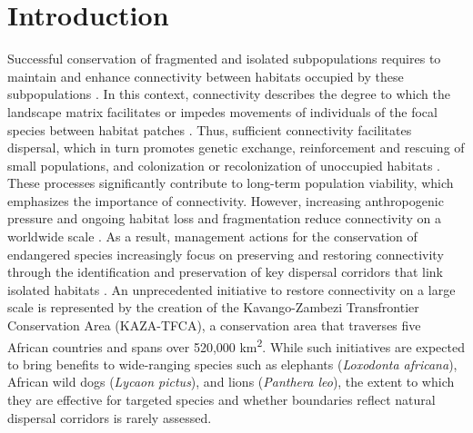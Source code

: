 \documentclass[abstract=on,10pt,a4paper,bibliography=totocnumbered]{scrartcl}
\begin{document}
\onehalfspacing
\tableofcontents
\doublespacing
\newpage


\section{Introduction}
Successful conservation of fragmented and isolated subpopulations requires to
maintain and enhance connectivity between habitats occupied by these
subpopulations \citep{Hanski.1998}. In this context, connectivity describes the
degree to which the landscape matrix facilitates or impedes movements of
individuals of the focal species between habitat patches \citep{Taylor.1993,
Clobert.2012}. Thus, sufficient connectivity facilitates dispersal, which in
turn promotes genetic exchange, reinforcement and rescuing of small populations,
and colonization or recolonization of unoccupied habitats \citep{Brown.1977,
Hanski.1998, MacArthur.2001, Frankham.2002, Leigh.2012}. These processes
significantly contribute to long-term population viability, which emphasizes the
importance of connectivity. However, increasing anthropogenic pressure and
ongoing habitat loss and fragmentation reduce connectivity on a worldwide scale
\citep{Fahrig.2003, Barnosky.2012}. As a result, management actions for the
conservation of endangered species increasingly focus on preserving and
restoring connectivity through the identification and preservation of key
dispersal corridors that link isolated habitats \citep{Fahrig.2003,
Heller.2009}. An unprecedented initiative to restore connectivity on a large
scale is represented by the creation of the Kavango-Zambezi Transfrontier
Conservation Area (KAZA-TFCA), a conservation area that traverses five African
countries and spans over 520,000 km\textsuperscript{2}. While such initiatives
are expected to bring benefits to wide-ranging species such as elephants
(\textit{Loxodonta africana}), African wild dogs (\textit{Lycaon pictus}), and
lions (\textit{Panthera leo}), the extent to which they are effective for
targeted species and whether boundaries reflect natural dispersal corridors is
rarely assessed.
\end{document}
